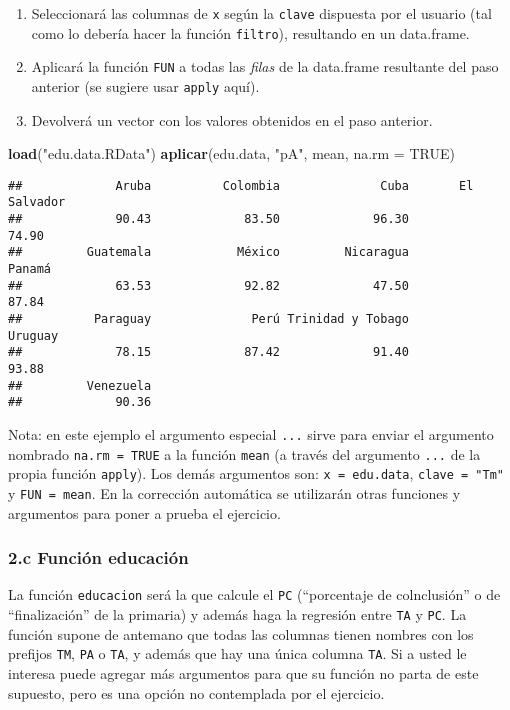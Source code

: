 \documentclass[]{article}
\newenvironment{Shaded}{}{}
\newcommand{\KeywordTok}[1]{\textcolor[rgb]{0.00,0.44,0.13}{\textbf{{#1}}}}
\newcommand{\DataTypeTok}[1]{\textcolor[rgb]{0.56,0.13,0.00}{{#1}}}
\newcommand{\StringTok}[1]{\textcolor[rgb]{0.25,0.44,0.63}{{#1}}}
\newcommand{\OtherTok}[1]{\textcolor[rgb]{0.00,0.44,0.13}{{#1}}}
\newcommand{\NormalTok}[1]{{#1}}
\begin{document}
\begin{enumerate}[1.]
\item
  Seleccionará las columnas de \texttt{x} según la \texttt{clave}
  dispuesta por el usuario (tal como lo debería hacer la función
  \texttt{filtro}), resultando en un data.frame.
\item
  Aplicará la función \texttt{FUN} a todas las \emph{filas} de la
  data.frame resultante del paso anterior (se sugiere usar
  \texttt{apply} aquí).
\item
  Devolverá un vector con los valores obtenidos en el paso anterior.
\end{enumerate}
\begin{Shaded}
\begin{Highlighting}[]
\KeywordTok{load}\NormalTok{(}\StringTok{"edu.data.RData"}\NormalTok{)}
\KeywordTok{aplicar}\NormalTok{(edu.data, }\StringTok{"pA"}\NormalTok{, mean, }\DataTypeTok{na.rm =} \OtherTok{TRUE}\NormalTok{)}
\end{Highlighting}
\end{Shaded}
\begin{verbatim}
##             Aruba          Colombia              Cuba       El Salvador 
##             90.43             83.50             96.30             74.90 
##         Guatemala            México         Nicaragua            Panamá 
##             63.53             92.82             47.50             87.84 
##          Paraguay              Perú Trinidad y Tobago           Uruguay 
##             78.15             87.42             91.40             93.88 
##         Venezuela 
##             90.36
\end{verbatim}
Nota: en este ejemplo el argumento especial \texttt{...} sirve para
enviar el argumento nombrado \texttt{na.rm = TRUE} a la función
\texttt{mean} (a través del argumento \texttt{...} de la propia función
\texttt{apply}). Los demás argumentos son: \texttt{x = edu.data},
\texttt{clave = "Tm"} y \texttt{FUN = mean}. En la corrección automática
se utilizarán otras funciones y argumentos para poner a prueba el
ejercicio.

\subsubsection{2.c Función educación}

La función \texttt{educacion} será la que calcule el \texttt{PC}
(``porcentaje de colnclusión'' o de ``finalización'' de la primaria) y
además haga la regresión entre \texttt{TA} y \texttt{PC}. La función
supone de antemano que todas las columnas tienen nombres con los
prefijos \texttt{TM}, \texttt{PA} o \texttt{TA}, y además que hay una
única columna \texttt{TA}. Si a usted le interesa puede agregar más
argumentos para que su función no parta de este supuesto, pero es una
opción no contemplada por el ejercicio.
\end{document}
